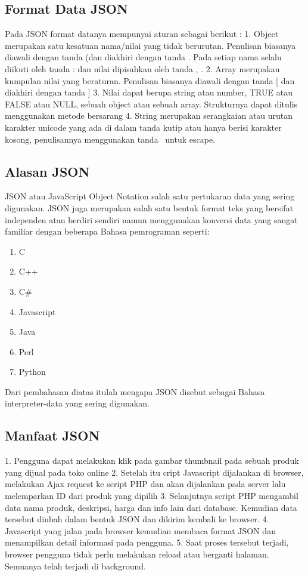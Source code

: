 \documentclass[a4paper]{article}
\begin{document}
\subsection{Format Data JSON}
Pada JSON format datanya mempunyai aturan sebagai berikut :
1. Object merupakan satu kesatuan nama/nilai yang tidak berurutan. Penulisan biasanya diawali dengan tanda { (dan diakhiri dengan tanda } .
Pada setiap nama selalu diikuti oleh tanda : dan nilai dipisahkan oleh tanda , .
2.  Array merupakan kumpulan nilai yang beraturan. Penulisan biasanya diawali dengan tanda [ dan diakhiri dengan tanda ]
3. Nilai dapat berupa string atau number, TRUE atau FALSE atau NULL, sebuah object atau sebuah array. Strukturnya dapat ditulis menggunakan metode bersarang
4. String merupakan serangkaian atau urutan karakter unicode yang ada di dalam tanda kutip atau hanya berisi karakter kosong, penulisannya menggunakan tanda \  untuk escape.

\subsection{Alasan JSON}
JSON atau JavaScript Object Notation salah satu pertukaran data yang sering digunakan. JSON juga merupakan salah satu bentuk format teks yang bersifat independen atau berdiri sendiri namun menggunakan konversi data yang sangat familiar dengan beberapa Bahasa pemrograman seperti:

\begin{enumerate}
\item C
\item C++
\item C\#
\item Javascript
\item Java
\item Perl
\item Python


\end{enumerate}
Dari pembahasan diatas itulah mengapa JSON disebut sebagai Bahasa interpreter-data yang sering digunakan.
\subsection{Manfaat JSON}
1.	Pengguna dapat melakukan klik pada gambar thumbnail pada sebuah produk yang dijual pada toko online
2.	Setelah itu cript Javascript dijalankan di browser, melakukan Ajax request ke script PHP dan akan dijalankan pada server lalu melemparkan ID dari produk yang dipilih
3.	Selanjutnya script PHP mengambil data nama produk, deskripsi, harga dan info lain dari database. Kemudian data tersebut diubah dalam bentuk JSON dan dikirim kembali ke browser.
4.	Javascript yang jalan pada browser kemudian membaca format JSON dan menampilkan detail informasi pada pengguna.
5.	Saat proses tersebut terjadi, browser pengguna tidak perlu melakukan reload atau berganti halaman. Semuanya telah terjadi di background.
\end{document}
